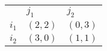 \begin{center}
    \begin{tabular}{lll}
                                 & $j_1$     & $j_2$                         \\ \cline{2-3}
    \multicolumn{1}{l|}{$i_1$}   & $(2, 2)$  & \multicolumn{1}{l|}{$(0, 3)$}  \\
    \multicolumn{1}{l|}{$i_2$}   & $(3, 0)$  & \multicolumn{1}{l|}{$(1, 1)$}  \\ \cline{2-3}
    \end{tabular}
\end{center}